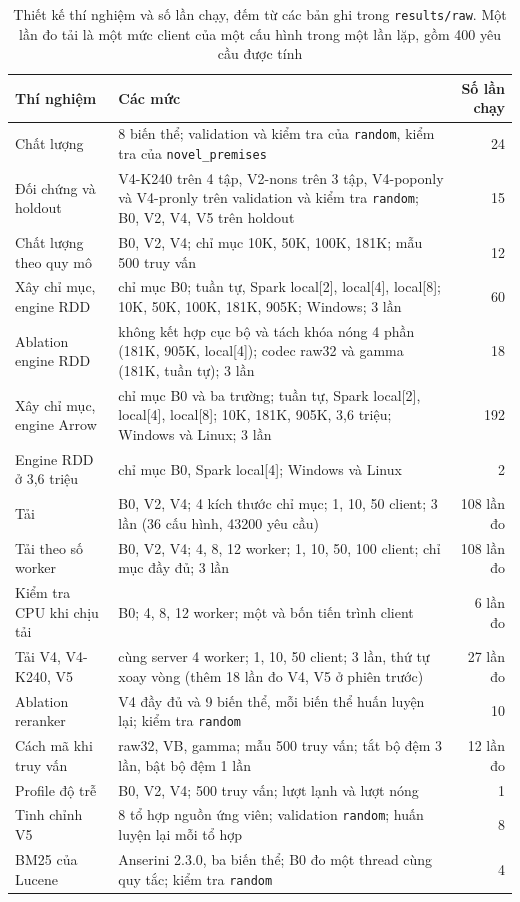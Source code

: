 \documentclass[11pt,a4paper,oneside]{report}
\newcommand{\code}[1]{\texttt{#1}}
\begin{document}
\begin{table}[htbp]
\centering
\caption[Thiết kế thí nghiệm]{Thiết kế thí nghiệm và số lần chạy, đếm từ các bản ghi trong \code{results/raw}. Một lần đo
tải là một mức client của một cấu hình trong một lần lặp, gồm 400 yêu cầu được tính}\label{tab:design}
\begin{tabularx}{\linewidth}{@{}lXr@{}}
\toprule
Thí nghiệm & Các mức & Số lần chạy \\
\midrule
Chất lượng & 8 biến thể; validation và kiểm tra của \code{random}, kiểm tra của \code{novel\_premises} & 24 \\
Đối chứng và holdout & V4-K240 trên 4 tập, V2-nons trên 3 tập, V4-poponly và V4-pronly trên validation và kiểm tra \code{random}; B0, V2, V4, V5 trên holdout & 15 \\
Chất lượng theo quy mô & B0, V2, V4; chỉ mục 10K, 50K, 100K, 181K; mẫu 500 truy vấn & 12 \\
Xây chỉ mục, engine RDD & chỉ mục B0; tuần tự, Spark local[2], local[4], local[8]; 10K, 50K, 100K, 181K, 905K; Windows; 3 lần & 60 \\
Ablation engine RDD & không kết hợp cục bộ và tách khóa nóng 4 phần (181K, 905K, local[4]); codec raw32 và gamma (181K, tuần tự); 3 lần & 18 \\
Xây chỉ mục, engine Arrow & chỉ mục B0 và ba trường; tuần tự, Spark local[2], local[4], local[8]; 10K, 181K, 905K, 3,6 triệu; Windows và Linux; 3 lần & 192 \\
Engine RDD ở 3,6 triệu & chỉ mục B0, Spark local[4]; Windows và Linux & 2 \\
Tải & B0, V2, V4; 4 kích thước chỉ mục; 1, 10, 50 client; 3 lần (36 cấu hình, \num{43200} yêu cầu) & 108 lần đo \\
Tải theo số worker & B0, V2, V4; 4, 8, 12 worker; 1, 10, 50, 100 client; chỉ mục đầy đủ; 3 lần & 108 lần đo \\
Kiểm tra CPU khi chịu tải & B0; 4, 8, 12 worker; một và bốn tiến trình client & 6 lần đo \\
Tải V4, V4-K240, V5 & cùng server 4 worker; 1, 10, 50 client; 3 lần, thứ tự xoay vòng (thêm 18 lần đo V4, V5 ở phiên trước) & 27 lần đo \\
Ablation reranker & V4 đầy đủ và 9 biến thể, mỗi biến thể huấn luyện lại; kiểm tra \code{random} & 10 \\
Cách mã khi truy vấn & raw32, VB, gamma; mẫu 500 truy vấn; tắt bộ đệm 3 lần, bật bộ đệm 1 lần & 12 lần đo \\
Profile độ trễ & B0, V2, V4; 500 truy vấn; lượt lạnh và lượt nóng & 1 \\
Tinh chỉnh V5 & 8 tổ hợp nguồn ứng viên; validation \code{random}; huấn luyện lại mỗi tổ hợp & 8 \\
BM25 của Lucene & Anserini 2.3.0, ba biến thể; B0 đo một thread cùng quy tắc; kiểm tra \code{random} & 4 \\
\bottomrule
\end{tabularx}
\end{table}
\end{document}
